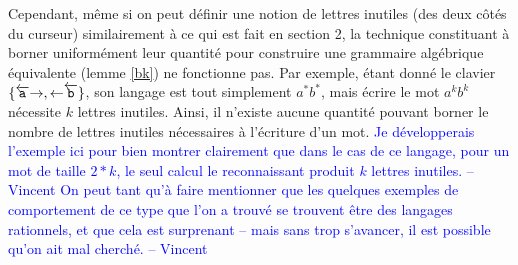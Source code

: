\documentclass[12pt, a4paper]{article}
\newcommand{\vincent}[1]{\textcolor{blue}{#1 -- Vincent}}
\begin{document}
    Cependant, même si on peut définir une notion de lettres inutiles (des deux côtés du curseur) similairement à ce qui est fait en section 2, la technique constituant à borner uniformément leur quantité pour construire une grammaire algébrique équivalente (lemme \ref{bk}) ne fonctionne pas.
    Par exemple, étant donné le clavier $\{\overleftarrow{\mathtt{a}}\mathord{\rightarrow},\mathord{\leftarrow}\overleftarrow{\mathtt{b}}\}$, son langage est tout simplement $a^*b^*$, mais écrire le mot $a^kb^k$ nécessite $k$ lettres inutiles. Ainsi, il n'existe aucune quantité pouvant borner le nombre de lettres inutiles nécessaires à l'écriture d'un mot.
    \vincent{Je développerais l’exemple ici pour bien montrer clairement que dans le cas de ce langage, pour un mot de taille $2*k$, le seul calcul le reconnaissant produit $k$ lettres inutiles.}
    \vincent{On peut tant qu’à faire mentionner que les quelques exemples de comportement de ce type que l’on a trouvé se trouvent être des langages rationnels, et que cela est surprenant -- mais sans trop s’avancer, il est possible qu’on ait mal cherché.}
    
    \clearpage
    \appendix
\end{document}
